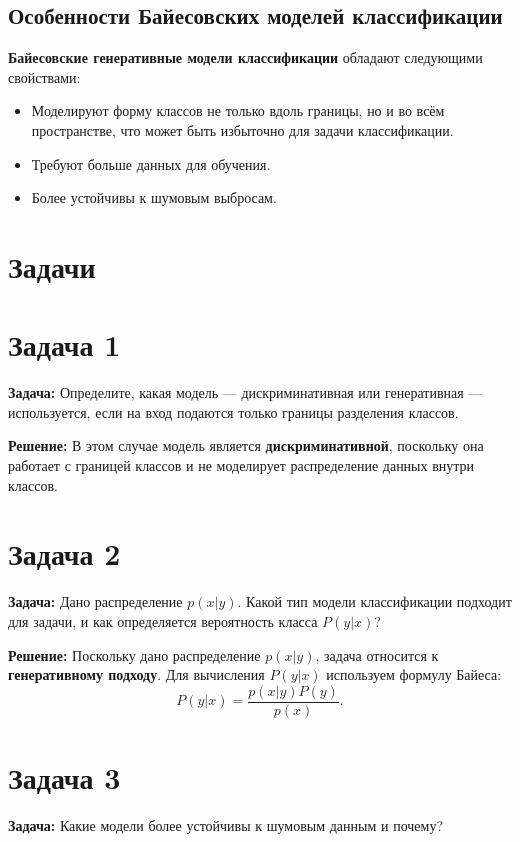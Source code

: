 \subsection{Особенности Байесовских моделей классификации}
\textbf{Байесовские генеративные модели классификации} обладают следующими свойствами:
\begin{itemize}
    \item Моделируют форму классов не только вдоль границы, но и во всём пространстве, что может быть избыточно для задачи классификации.
    \item Требуют больше данных для обучения.
    \item Более устойчивы к шумовым выбросам.
\end{itemize}

\section{Задачи}


\section*{Задача 1}
\textbf{Задача:} Определите, какая модель — дискриминативная или генеративная — используется, если на вход подаются только границы разделения классов.

\textbf{Решение:} В этом случае модель является \textbf{дискриминативной}, поскольку она работает с границей классов и не моделирует распределение данных внутри классов.

\section*{Задача 2}
\textbf{Задача:} Дано распределение $p(x|y)$. Какой тип модели классификации подходит для задачи, и как определяется вероятность класса $P(y|x)$?

\textbf{Решение:} Поскольку дано распределение $p(x|y)$, задача относится к \textbf{генеративному подходу}. Для вычисления $P(y|x)$ используем формулу Байеса:
\begin{equation}
    P(y|x) = \frac{p(x|y) P(y)}{p(x)}.
\end{equation}

\section*{Задача 3}
\textbf{Задача:} Какие модели более устойчивы к шумовым данным и почему?

